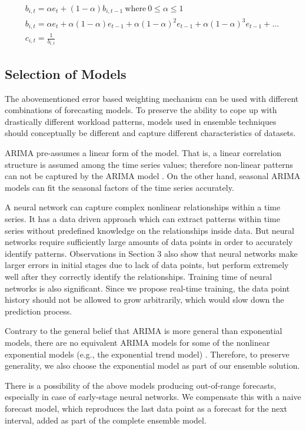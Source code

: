 \begin{multline}
b_{i,t}= \alpha e_t + (1-\alpha)b_{i,t-1} \ \mathrm{where} \ 0\leq \alpha \leq 1	\\ 
b_{i,t}=\alpha e_t + \alpha(1-\alpha)e_{t-1}+\alpha(1-\alpha)^2e_{t-1}+\alpha(1-\alpha)^3e_{t-1}+ . .. \  \\
 c_{i,t}=\frac{1}{b_{i,t}}
\end{multline}

\subsection{Selection of Models}
The abovementioned error based weighting mechanism can be used with different combinations of forecasting models. To preserve the ability to cope up with drastically different workload patterns, models used in ensemble techniques should conceptually be different and capture different characteristics of datasets.

ARIMA pre-assumes a linear form of the model. That is, a linear correlation structure is assumed among the time series values; therefore non-linear patterns can not be captured by the ARIMA model \cite{Zhang_2003}. On the other hand, seasonal ARIMA models can fit the seasonal factors of the time series accurately.

A neural network can capture complex nonlinear relationships within a time series. It has a data driven approach which can extract patterns within time series without predefined knowledge on the relationships inside data. But neural networks require sufficiently large amounts of data points in order to accurately identify patterns. Observations in Section 3 also show that neural networks make larger errors in initial stages due to lack of data points, but perform extremely well after they correctly identify the relationships. Training time of neural networks is also significant. Since we propose real-time training, the data point history should not be allowed to grow arbitrarily, which would slow down the prediction process.

Contrary to the general belief that ARIMA is more general than exponential models, there are no equivalent ARIMA models for some of the nonlinear exponential models (e.g., the exponential trend model) \cite{AHyndman 2013}. Therefore, to preserve generality, we also choose the exponential model as part of our ensemble solution.

There is a possibility of the above models producing out-of-range forecasts, especially in case of early-stage neural networks. We compensate this with a naive forecast model, which reproduces the last data point as a forecast for the next interval, added as part of the complete ensemble model.


